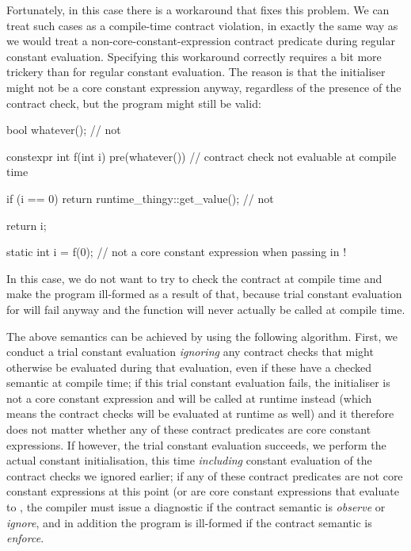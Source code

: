 Fortunately, in this case there is a workaround that fixes this problem. We can treat such cases as a compile-time contract violation, in exactly the same way as we would treat a non-core-constant-expression contract predicate during regular constant evaluation. Specifying this workaround correctly requires a bit more trickery than for regular constant evaluation. The reason is that the initialiser might not be a core constant expression anyway, regardless of the presence of the contract check, but the program might still be valid:

\begin{codeblock}
bool whatever();     // not 

constexpr int f(int i)
  pre(whatever())  // contract check not evaluable at compile time
{
  if (i == 0)
    return runtime_thingy::get_value();  // not 

  return i;
}

static int i = f(0);  // not a core constant expression when passing in !
\end{codeblock}

In this case, we do not want to try to check the contract at compile time and make the program ill-formed as a result of that, because trial constant evaluation for  will fail anyway and the function will never actually be called at compile time.

The above semantics can be achieved by using the following algorithm. First, we conduct a trial constant evaluation \emph{ignoring} any contract checks that might otherwise be evaluated during that evaluation, even if these have a checked semantic at compile time; if this trial constant evaluation fails, the initialiser is not a core constant expression and will be called at runtime instead (which means the contract checks will be evaluated at runtime as well) and it therefore does not matter whether any of these contract predicates are core constant expressions. If however, the trial constant evaluation succeeds, we perform the actual constant initialisation, this time \emph{including} constant evaluation of the contract checks we ignored earlier; if any of these contract predicates are not core constant expressions at this point (or are core constant expressions that evaluate to , the compiler must issue a diagnostic if the contract semantic is \emph{observe} or \emph{ignore}, and in addition the program is ill-formed if the contract semantic is \emph{enforce}.

